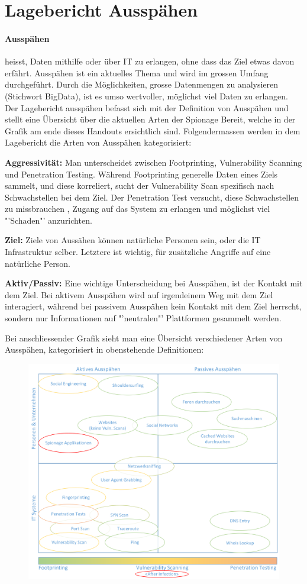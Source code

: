 \section*{Lagebericht Ausspähen}
\paragraph{Ausspähen} heisst, Daten mithilfe oder über IT zu erlangen, ohne dass das Ziel etwas davon erfährt. Ausspähen ist ein aktuelles Thema und wird im grossen Umfang durchgeführt. Durch die Möglichkeiten, grosse Datenmengen zu analysieren (Stichwort BigData), ist es umso wertvoller, möglichst viel Daten zu erlangen.  Der Lagebericht ausspähen befasst sich mit der Definition von Ausspähen und stellt eine Übersicht über die aktuellen Arten der Spionage Bereit, welche in der Grafik am ende dieses Handouts ersichtlich sind. Folgendermassen werden in dem Lagebericht die Arten von Ausspähen kategorisiert:

\textbf{Aggressivität:} Man unterscheidet zwischen Footprinting, Vulnerability Scanning und Penetration Testing. Während Footprinting generelle Daten eines Ziels sammelt, und diese korreliert, sucht der Vulnerability Scan spezifisch nach Schwachstellen bei dem Ziel. Der Penetration Test versucht, diese Schwachstellen zu missbrauchen , Zugang auf das System zu erlangen und möglichst viel "'Schaden"' anzurichten.
 
\textbf{Ziel:} Ziele von Aussähen können natürliche Personen sein, oder die IT Infrastruktur selber. Letztere ist wichtig, für zusätzliche Angriffe auf eine natürliche Person.
 
\textbf{Aktiv/Passiv:} Eine wichtige Unterscheidung bei Ausspähen, ist der Kontakt mit dem Ziel. Bei aktivem Ausspähen wird auf irgendeinem Weg mit dem Ziel interagiert, während bei passivem Ausspähen kein Kontakt mit dem Ziel herrscht, sondern nur Informationen auf "'neutralen"' Plattformen gesammelt werden. 

Bei anschliessender Grafik sieht man eine Übersicht verschiedener Arten von Ausspähen, kategorisiert in obenstehende Definitionen:

\begin{figure}[h]
\centering
\vspace{-0.3cm}
\includegraphics[width=0.8\linewidth]{../Graphics/uebersichtsmatrix.png}
\label{fig:itilv}
\vspace{-2.1
cm}
\end{figure}



